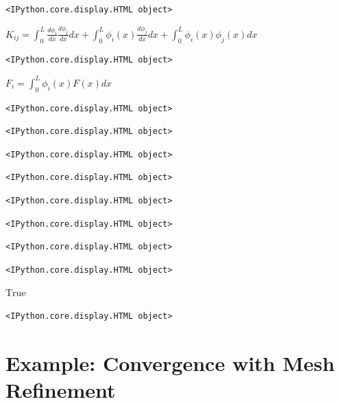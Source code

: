 \documentclass[
  11pt,
  a4paper,
]{scrbook}
\begin{document}
\begin{verbatim}
<IPython.core.display.HTML object>
\end{verbatim}

$\displaystyle K_{ij} = \int_0^L \frac{d\phi_i}{dx} \frac{d\phi_j}{dx} dx + \int_0^L \phi_i(x) \frac{d\phi_j}{dx} dx + \int_0^L \phi_i(x) \phi_j(x) dx$

\begin{verbatim}
<IPython.core.display.HTML object>
\end{verbatim}

$\displaystyle F_i = \int_0^L \phi_i(x) F(x) dx$

\begin{verbatim}
<IPython.core.display.HTML object>
\end{verbatim}

\begin{verbatim}
<IPython.core.display.HTML object>
\end{verbatim}

\begin{verbatim}
<IPython.core.display.HTML object>
\end{verbatim}

\begin{verbatim}
<IPython.core.display.HTML object>
\end{verbatim}

\begin{verbatim}
<IPython.core.display.HTML object>
\end{verbatim}

\begin{verbatim}
<IPython.core.display.HTML object>
\end{verbatim}

\begin{verbatim}
<IPython.core.display.HTML object>
\end{verbatim}

\begin{verbatim}
<IPython.core.display.HTML object>
\end{verbatim}

$\displaystyle \text{True}$

\begin{verbatim}
<IPython.core.display.HTML object>
\end{verbatim}

\section{Example: Convergence with Mesh
Refinement}\label{sec-convergence-example}
\end{document}
